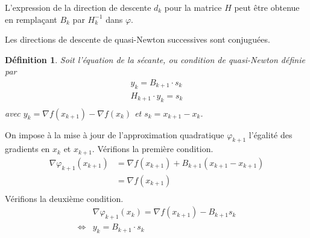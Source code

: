 \documentclass[3p, twocolumn]{elsarticle}
\newtheorem{definition}{Définition}[section]
\begin{document}
\begin{rmk}
    L'expression de la direction de descente $d_k$ pour la matrice $H$ peut être obtenue en remplaçant $B_k$ par $H_k^{-1}$ dans $\varphi$.
\end{rmk}
\begin{rmk}
    Les directions de descente de quasi-Newton successives sont conjuguées.
\end{rmk}

\begin{definition}
    Soit l'équation de la sécante, ou condition de quasi-Newton définie par
    \begin{align}
        y_k = B_{k+1} \cdot s_k
        \label{eq:sec-qn-bk} \\
        H_{k+1} \cdot y_k = s_k
        \label{eq:sec-qn-hk} \\
    \end{align}
    avec $y_k = \nabla f(x_{k+1}) - \nabla f(x_k)$ et $s_k = x_{k+1} - x_k$.
\end{definition}
\begin{pf}
    On impose à la mise à jour de l'approximation quadratique $\varphi_{k+1}$ l'égalité des gradients en $x_k$ et $x_{k+1}$.
    Vérifions la première condition.
    \begin{align*}
        \nabla \varphi_{k+1}(x_{k+1}) & = \nabla f(x_{k+1}) + B_{k+1}(x_{k+1} - x_{k+1}) \\
                                      & = \nabla f(x_{k+1})                              \\
    \end{align*}
    Vérifions la deuxième condition.
    \begin{align*}
             & \nabla \varphi_{k+1}(x_{k}) = \nabla f(x_{k+1}) - B_{k+1}s_k \\
        \iff & y_k = B_{k+1}\cdot s_k
    \end{align*}
\end{pf}
\end{document}
